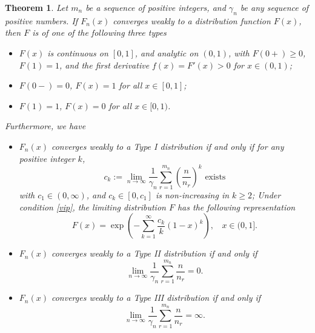 \documentclass[11pt]{article}
\newtheorem{thm}{\textbf{Theorem}}[section]
\numberwithin{equation}{section}
\begin{document}
\begin{thm}\label{type}
    Let $m_n$ be a sequence of positive integers, and $\gamma_n$ be any sequence of positive numbers.
    If  $F_n(x)$ converges weakly to a distribution function $F(x)$,
then  $F$ is of one of the following three types
\begin{itemize}
\item[(I).] $F(x)$ is continuous on $[0,1]$, and analytic on $(0,1)$, with $F(0+)\geq0$,
    $F(1)=1$, and the first derivative $f(x)=F'(x)> 0$  for $x\in
(0,1)$;
\item[(II).] $F(0-)=0$, $F(x)=1$ for all $x\in [0,1]$;
\item[(III).] $F(1)=1$, $F(x)=0$ for all $x\in [0,1)$.
\end{itemize}
Furthermore, we have
\begin{itemize}
\item[(a).]
    $F_n(x)$ converges weakly to  a Type I distribution if and only if  for any positive integer $k$,
    \begin{equation}\label{vip}
     c_k:=\lim_{n\rightarrow\infty}\frac{1}{\gamma_{n}} \sum_{r=1}^{m_n}
\left(\frac{n}{n_{r}}\right)^k\mbox{ exists}
    \end{equation}
    with $c_1\in (0,\infty)$, and $c_k\in [0, c_1]$ is non-increasing in $k\ge
2$; Under condition \eqref{vip}, the limiting distribution $F$ has
the following representation
\begin{equation}\label{F-rep}
F(x)=\exp(-\sum^\infty_{k=1}\frac{c_k}{k}(1-x)^k),~~~~x\in (0,1].
\end{equation}

\item[(b).] $F_n(x)$ converges weakly to a Type II distribution if and only if
    \begin{equation}\label{zero}
    \lim_{n\rightarrow\infty}\frac{1}{\gamma_{n}} \sum_{r=1}^{m_n} \frac{n}{n_{r}}=0.
    \end{equation}
\item[(c).]
    $F_n(x)$ converges weakly to a Type III distribution if and only if
    \begin{equation}\label{infinity}
    \lim_{n\rightarrow\infty}\frac{1}{\gamma_{n}} \sum_{r=1}^{m_n}
\frac{n}{n_{r}}=\infty.
    \end{equation}
\end{itemize}
\end{thm}



\end{document}
